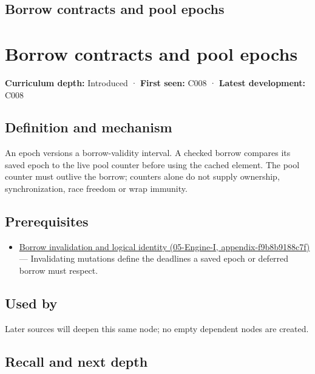 \hypertarget{appendix-aa405b7c3903}{}
\section*{Borrow contracts and pool epochs}
\chapter{Borrow contracts and pool epochs}\label{appendix-aa405b7c3903-borrow-contracts-and-pool-epochs}

\textbf{Curriculum depth:} Introduced · \textbf{First seen:} C008 · \textbf{Latest development:} C008

\section{Definition and mechanism}\label{appendix-aa405b7c3903-definition-and-mechanism}

An epoch versions a borrow-validity interval. A checked borrow compares its saved epoch to the live pool counter before using the cached element. The pool counter must outlive the borrow; counters alone do not supply ownership, synchronization, race freedom or wrap immunity.

\section{Prerequisites}\label{appendix-aa405b7c3903-prerequisites}

\begin{itemize}
\tightlist
\item
  \href{../05-Engine-I/main.pdf\#nameddest=appendix-f9b8b9188c7f}{Borrow invalidation and logical identity (05-Engine-I, appendix-f9b8b9188c7f)} --- Invalidating mutations define the deadlines a saved epoch or deferred borrow must respect.
\end{itemize}

\section{Used by}\label{appendix-aa405b7c3903-used-by}

Later sources will deepen this same node; no empty dependent nodes are created.

\section{Recall and next depth}\label{appendix-aa405b7c3903-recall-and-next-depth}

